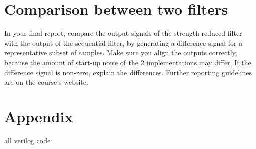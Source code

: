 \documentclass[a4paper,twoside,11pt, fleqn]{article}
\begin{document}
\newpage
\section*{Comparison between two filters}
In your final report, compare the output signals of the strength reduced filter with the output of the sequential filter, by generating a difference signal for a representative subset of
samples. Make sure you align the outputs correctly, because the amount of start-up noise of
the 2 implementations may differ. If the difference signal is non-zero, explain the differences.
Further reporting guidelines are on the course’s website.

\newpage
\section*{Appendix}
all verilog code
\end{document}

